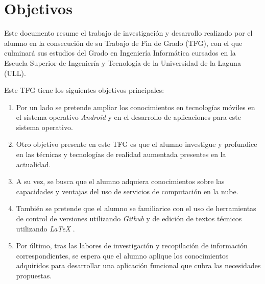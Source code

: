%
%
%
%


\chapter{Objetivos} \label{chap:Objetivos}  

Este documento resume el trabajo de investigación y desarrollo realizado por el alumno en la consecución de su Trabajo de Fin de Grado (TFG), con el que culminará sus estudios del Grado en Ingeniería Informática cursados en la Escuela Superior de Ingeniería y Tecnología de la Universidad de la Laguna (ULL).

Este TFG tiene los siguientes objetivos principales:
	
\begin{enumerate}
\item Por un lado se pretende ampliar los conocimientos en tecnologías móviles en el sistema operativo \textit{Android} \cite{URL::Android} y en el desarrollo de aplicaciones para este sistema operativo.

\item Otro objetivo presente en este TFG es que el alumno investigue y profundice en las técnicas y tecnologías de realidad aumentada presentes en la actualidad.

\item A su vez, se busca que el alumno adquiera conocimientos sobre las capacidades y ventajas del uso de servicios de computación en la nube.

\item También se pretende que el alumno se familiarice con el uso de herramientas de control de versiones utilizando \textit{Github} \cite{URL::Github} y de edición de textos técnicos utilizando \textit{LaTeX}  \cite{URL::LaTeX}.

\item   Por último, tras las labores de investigación y recopilación de información correspondientes, se espera que el alumno aplique los conocimientos adquiridos para desarrollar una aplicación funcional que cubra las necesidades propuestas.
\end{enumerate} 
